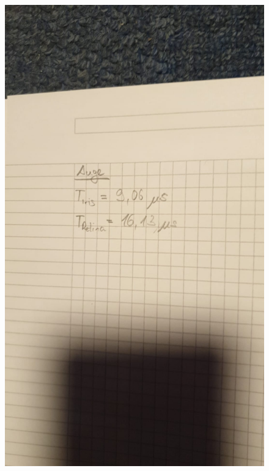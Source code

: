 \begin{figure}
    \centering
    \includegraphics[width=\textwidth]{data/Messdaten_3.jpeg}
\end{figure}
